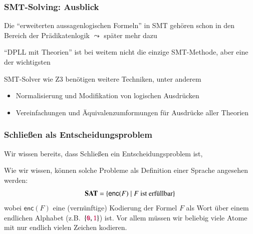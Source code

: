 \documentclass[aspectratio=1610,onlymath]{beamer}
\let\beameroriginaldoublebackslash\\
\let\\=\beameroriginaldoublebackslash
\begin{document}
\begin{frame}\frametitle{SMT-Solving: Ausblick}

Die "`erweiterten aussagenlogischen Formeln"' in SMT gehören schon in den Bereich der \alert{Prädikatenlogik}
$\leadsto$ später mehr dazu
\bigskip

"`DPLL mit Theorien"' ist bei weitem nicht die einzige SMT-Methode, aber eine der wichtigsten
\bigskip

SMT-Solver wie Z3 benötigen weitere Techniken, unter anderem
\begin{itemize}
\item Normalisierung und Modifikation von logischen Ausdrücken
\item Vereinfachungen und Äquivalenzumformungen für Ausdrücke aller Theorien
\end{itemize}
\bigskip



\end{frame}


\begin{frame}\frametitle{Schließen als Entscheidungsproblem}

Wir wissen bereits, dass Schließen ein Entscheidungsproblem ist,


Wie wir wissen, können solche Probleme als Definition einer Sprache angesehen werden:
\[\textbf{\textcolor{black}{SAT}} = \{ \textsf{enc}(F)\mid F\text{ ist erfüllbar}\}\]
wobei $\textsf{enc}(F)$ eine (vernünftige) Kodierung der Formel $F$ als Wort über einem endlichen Alphabet (z.B.\ $\{\mathtt{\textcolor{purple}{0}},\mathtt{\textcolor{purple}{1}}\}$) ist. Vor allem müssen wir beliebig viele Atome mit nur endlich vielen Zeichen kodieren.
\bigskip\pause


\end{frame}
\end{document}
